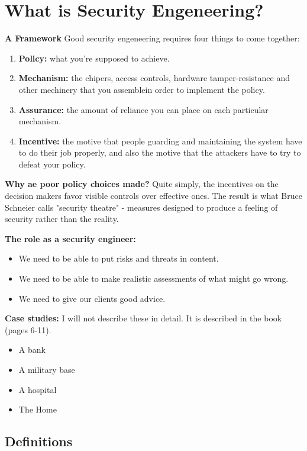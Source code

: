 \chapter{What is Security Engeneering?}
\clearpage

{\bf A Framework} Good security engeneering requires four things to come together:
	\begin{enumerate} 
		\item {\bf Policy:} what you're supposed to achieve.
		\item {\bf Mechanism:} the chipers, access controls, hardware tamper-resistance
		and other mechinery that you assemblein order to implement the policy.
		\item {\bf Assurance:} the amount of reliance you can place on each particular mechanism.
		\item {\bf Incentive:} the motive that people guarding and maintaining the system
		have to do their job properly, and also the motive that the attackers have to try to defeat
		your policy. 
	\end{enumerate}


{\bf Why ae poor policy choices made? } Quite simply, the incentives on the decision makers
favor visible controls over effective ones. The result is what Bruce Schneier calls 
"security theatre" - measures designed to produce a feeling of security rather than the reality.


{\bf The role as a security engineer:} 
	\begin{itemize}
		\item We need to be able to put risks and threats in content.
		\item We need to be able to make realistic assessments of what might go wrong.
		\item We need to give our clients good advice.
	\end{itemize}


{\bf Case studies:} I will not describe these in detail. It is described in the book (pages 6-11).
	\begin{itemize}
		\item A bank
		\item A military base
		\item A hospital
		\item The Home
	\end{itemize}

\clearpage
\section{Definitions}
